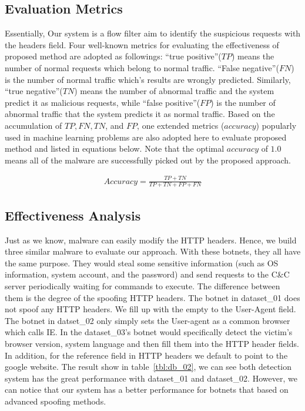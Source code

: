 \subsection{Evaluation Metrics}

Essentially, Our system is a flow filter aim to identify the suspicious requests with the headers field. Four well-known metrics for evaluating the effectiveness of proposed method are adopted as followings: ``true positive''($TP$) means the number of normal requests which belong to normal traffic. ``False negative''($FN$) is the number of normal traffic which's results are wrongly predicted. Similarly, ``true negative''($TN$) means the number of abnormal traffic and the system predict it as malicious requests, while ``false positive''($FP$) is the number of abnormal traffic that the system predicts it as normal traffic. Based on the accumulation of $TP, FN, TN$, and $FP$, one extended metrics ($accuracy$) popularly used in machine learning problems are also adopted here to evaluate proposed method and listed in equations below. Note that the optimal $accuracy$ of $1.0$ means all of the malware are successfully picked out by the proposed approach. 


\begin{eqnarray}
\label{eq:accuracy}
Accuracy = \frac{TP+TN}{TP+TN+FP+FN}
\end{eqnarray}

\subsection{Effectiveness Analysis}

Just as we know, malware can easily modify the HTTP headers. Hence, we build three similar malware to evaluate our approach. With these botnets, they all have the same purpose. They would steal some sensitive information (such as OS information, system account, and the password) and send requests to the C\&C server periodically waiting for commands to execute. The difference between them is the degree of the spoofing HTTP headers. The botnet in dataset\_01 does not spoof any HTTP headers. We fill up with the empty to the User-Agent field. The botnet in datset\_02 only simply sets the User-agent as a common browser which calls IE. In the dataset\_03's botnet would specifically detect the victim's browser version, system language and then fill them into the HTTP header fields. In addition, for the reference field in HTTP headers we default to point to the google website. The result show in table~\ref{tbl:db_02}, we can see both detection system has the great performance with dataset\_01 and dataset\_02. However, we can notice that our system has a better performance for botnets that based on advanced spoofing methods.
\\

